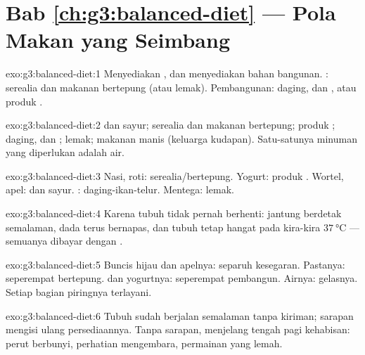 \section*{Bab \ref{ch:g3:balanced-diet} --- Pola Makan yang Seimbang}

\begin{solution}{exo:g3:balanced-diet:1}
Menyediakan , dan menyediakan bahan bangunan. : serealia
dan makanan bertepung (atau lemak). Pembangunan: daging,  dan
, atau produk .
\end{solution}

\begin{solution}{exo:g3:balanced-diet:2}
 dan sayur; serealia dan makanan bertepung; produk ; daging,
 dan ; lemak; makanan manis (keluarga kudapan). Satu-satunya
minuman yang diperlukan adalah air.
\end{solution}

\begin{solution}{exo:g3:balanced-diet:3}
Nasi, roti: serealia/bertepung. Yogurt: produk . Wortel, apel:
 dan sayur. : daging-ikan-telur. Mentega: lemak.
\end{solution}

\begin{solution}{exo:g3:balanced-diet:4}
Karena tubuh tidak pernah berhenti: jantung berdetak semalaman, dada
terus bernapas, dan tubuh tetap hangat pada kira-kira
$\qty{37}{\degreeCelsius}$ --- semuanya dibayar dengan .
\end{solution}

\begin{solution}{exo:g3:balanced-diet:5}
Buncis hijau dan apelnya: separuh kesegaran. Pastanya: seperempat
bertepung.  dan yogurtnya: seperempat pembangun. Airnya: gelasnya.
Setiap bagian piringnya terlayani.
\end{solution}

\begin{solution}{exo:g3:balanced-diet:6}
Tubuh sudah berjalan semalaman tanpa kiriman; sarapan mengisi ulang
persediaannya. Tanpa sarapan, menjelang tengah pagi 
kehabisan: perut berbunyi, perhatian mengembara, permainan yang lemah.
\end{solution}

